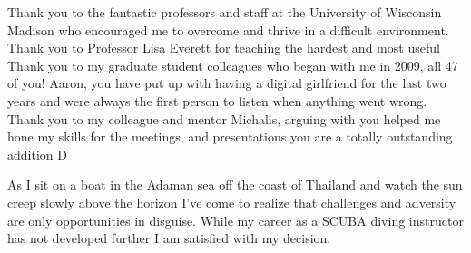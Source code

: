 Thank you to the fantastic professors and staff at the University of Wisconsin Madison 
who encouraged me to overcome and thrive in a difficult environment.
Thank you to Professor Lisa Everett for teaching the hardest and most useful
Thank you to my graduate student colleagues who began with me in 2009, all 47 of you! 
Aaron, you have put up with having a digital girlfriend for the last two years and
were always the first person to listen when anything went wrong.
Thank you to my colleague and mentor Michalis, arguing with you helped me hone my
skills for the meetings, and presentations you are a totally outstanding addition D%

As I sit on a boat in the Adaman sea off the coast of Thailand and watch the sun creep 
slowly above the horizon I've come to realize that challenges and adversity 
are only opportunities in disguise.
While my career as a SCUBA diving instructor has not developed further I am
satisfied with my decision. 